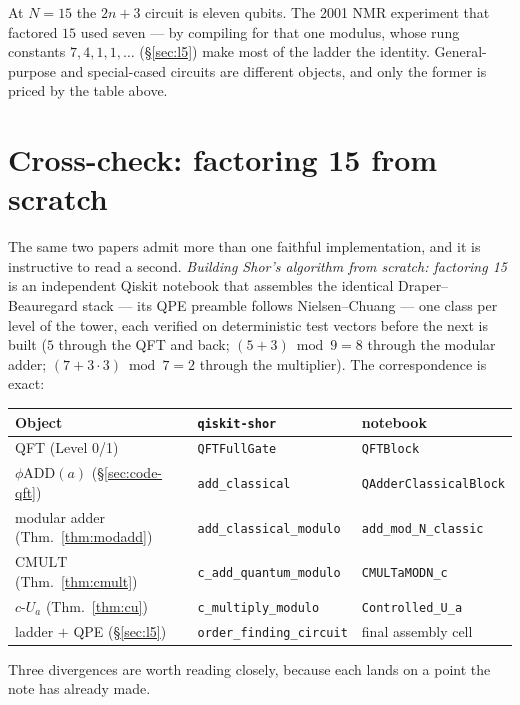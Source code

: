 \documentclass[11pt]{article}
\newcommand{\CMULT}{\mathrm{CMULT}}
\newcommand{\code}[1]{\texttt{#1}}
\theoremstyle{plain}
\theoremstyle{remark}
\begin{document}
\medskip\noindent
At $N=15$ the $2n+3$ circuit is eleven qubits. The 2001 NMR experiment that factored $15$
\cite{vandersypen} used seven --- by compiling for that one modulus, whose rung constants
$7,4,1,1,\dots$ (\S\ref{sec:l5}) make most of the ladder the identity. General-purpose and
special-cased circuits are different objects, and only the former is priced by the table above.

\section{Cross-check: factoring 15 from scratch}\label{sec:code-15}

The same two papers admit more than one faithful implementation, and it is instructive to read a
second. \emph{Building Shor's algorithm from scratch: factoring 15} \cite{notebook15} is an
independent Qiskit notebook that assembles the identical Draper--Beauregard stack --- its QPE
preamble follows Nielsen--Chuang \cite{nielsen-chuang} --- one class per level of the tower, each
verified on deterministic test vectors before the next is built ($5$ through the QFT and back;
$(5+3)\bmod 9=8$ through the modular adder; $(7+3\cdot3)\bmod 7=2$ through the multiplier). The
correspondence is exact:

\begin{center}\small
\begin{tabular}{@{}lll@{}}
\toprule
Object & \code{qiskit-shor} & notebook \cite{notebook15}\\
\midrule
QFT (Level 0/1) & \code{QFTFullGate} & \code{QFTBlock}\\
$\phi\mathrm{ADD}(a)$ (\S\ref{sec:code-qft}) & \code{add\_classical} & \code{QAdderClassicalBlock}\\
modular adder (Thm.~\ref{thm:modadd}) & \code{add\_classical\_modulo} & \code{add\_mod\_N\_classic}\\
$\CMULT$ (Thm.~\ref{thm:cmult}) & \code{c\_add\_quantum\_modulo} & \code{CMULTaMODN\_c}\\
$c\text{-}U_a$ (Thm.~\ref{thm:cu}) & \code{c\_multiply\_modulo} & \code{Controlled\_U\_a}\\
ladder $+$ QPE (\S\ref{sec:l5}) & \code{order\_finding\_circuit} & final assembly cell\\
\bottomrule
\end{tabular}
\end{center}

\medskip\noindent
Three divergences are worth reading closely, because each lands on a point the note has already
made.
\end{document}
